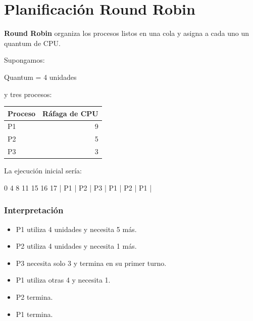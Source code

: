 \documentclass[
  spanish,
  letterpaper,
]{scrbook}
\newenvironment{Shaded}{\begin{snugshade}}{\end{snugshade}}
\newcommand{\NormalTok}[1]{\textcolor[rgb]{0.00,0.23,0.31}{#1}}
\newcounter{none} %
\providecommand{\tightlist}{%
  \setlength{\itemsep}{0pt}\setlength{\parskip}{0pt}}
\begin{document}

\chapter{Planificación Round Robin}\label{planificaciuxf3n-round-robin}

\textbf{Round Robin} organiza los procesos listos en una cola y asigna a
cada uno un quantum de CPU.

Supongamos:

\begin{Shaded}
\begin{Highlighting}[]
\NormalTok{Quantum = 4 unidades}
\end{Highlighting}
\end{Shaded}

y tres procesos:

{\def\LTcaptype{none} %
\begin{longtable}[]{@{}lr@{}}
\toprule\noalign{}
Proceso & Ráfaga de CPU \\
\midrule\noalign{}
\endhead
\bottomrule\noalign{}
\endlastfoot
P1 & 9 \\
P2 & 5 \\
P3 & 3 \\
\end{longtable}
}

La ejecución inicial sería:

\begin{Shaded}
\begin{Highlighting}[]
\NormalTok{0       4       8      11      15      16      17}
\NormalTok{|  P1   |  P2   | P3  |  P1   |  P2  | P1 |}
\end{Highlighting}
\end{Shaded}

\subsection{Interpretación}\label{interpretaciuxf3n}

\begin{itemize}
\tightlist
\item
  P1 utiliza 4 unidades y necesita 5 más.
\item
  P2 utiliza 4 unidades y necesita 1 más.
\item
  P3 necesita solo 3 y termina en su primer turno.
\item
  P1 utiliza otras 4 y necesita 1.
\item
  P2 termina.
\item
  P1 termina.
\end{itemize}
\end{document}
